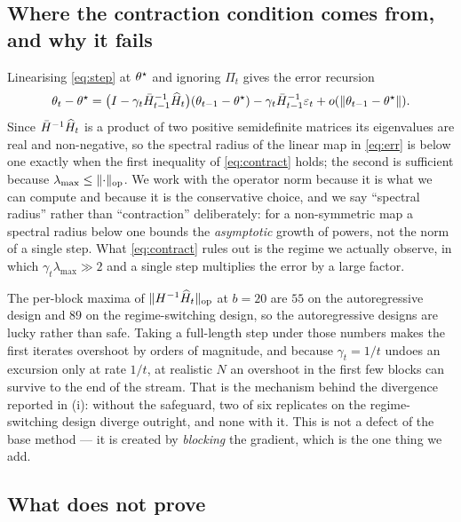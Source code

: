 
\subsection{Where the contraction condition comes from, and why it fails}
\label{app:contract}

Linearising \eqref{eq:step} at $\theta^\star$ and ignoring $\Pi_t$ gives the error recursion
\begin{equation}
\theta_t-\theta^\star=\big(I-\gamma_t\bar{H}_{t-1}^{-1}\widehat H_t\big)(\theta_{t-1}-\theta^\star)
             -\gamma_t\bar{H}_{t-1}^{-1}\varepsilon_t+o(\lVert \theta_{t-1}-\theta^\star \rVert).
\label{eq:err}
\end{equation}
Since $\bar{H}^{-1}\widehat H_t$ is a product of two positive semidefinite matrices its eigenvalues are real and
non-negative, so the spectral radius of the linear map in \eqref{eq:err} is below one exactly when the
first inequality of \eqref{eq:contract} holds; the second is sufficient because
$\lambda_{\max}\le\lVert \cdot \rVert_{\mathrm{op}}$. We work with the operator norm because it is what we can compute and
because it is the conservative choice, and we say ``spectral radius'' rather than ``contraction''
deliberately: for a non-symmetric map a spectral radius below one bounds the \emph{asymptotic} growth of
powers, not the norm of a single step. What \eqref{eq:contract} rules out is the regime we actually
observe, in which $\gamma_t\lambda_{\max}\gg2$ and a single step multiplies the error by a large factor.

The per-block maxima of $\lVert H^{-1}\widehat H_t \rVert_{\mathrm{op}}$ at $b=20$ are $55$ on the autoregressive design and $89$
on the regime-switching design, so the autoregressive designs are lucky rather than safe. Taking a
full-length step under those numbers makes the first iterates overshoot by orders of magnitude, and
because $\gamma_t=1/t$ undoes an excursion only at rate $1/t$, at realistic $N$ an overshoot in the
first few blocks can survive to the end of the stream. That is the mechanism behind the divergence
reported in (i): without the safeguard, two of six replicates on the
regime-switching design diverge outright, and none with it. This is not a defect of the base method ---
it is created by \emph{blocking} the gradient, which is the one thing we add.

\subsection{What \texorpdfstring{}{the safeguard proposition} does not prove}
\label{app:notproved}


